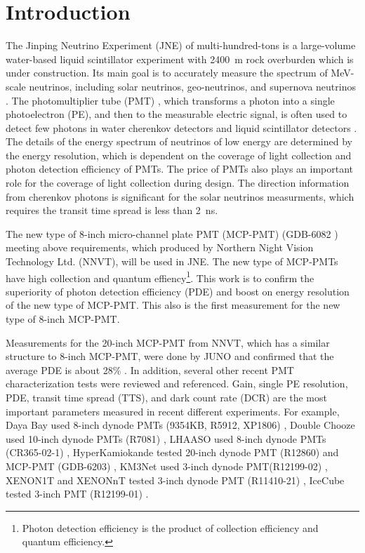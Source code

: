 \section{Introduction}
The Jinping Neutrino Experiment (JNE) of multi-hundred-tons is a large-volume water-based liquid scintillator experiment with \SI{2400}{m} rock overburden \cite{LetterJNE2017} which is under construction. Its main goal is to accurately measure the spectrum of MeV-scale neutrinos, including solar neutrinos, geo-neutrinos, and supernova neutrinos \cite{LetterJNE2017}.
The photomultiplier tube (PMT) \cite{HAMAMATSUManual}, which transforms a photon into a single photoelectron (PE), and then to the measurable electric signal, is often used to detect few photons in water cherenkov detectors \cite{SNO,SuperK} and liquid scintillator detectors \cite{KamLAND,JUNO:2015zny}. The details of the energy spectrum of neutrinos of low energy are determined by the energy resolution, which is dependent on the coverage of light collection and photon detection efficiency of PMTs. The price of PMTs also plays an important role for the coverage of light collection during design. The direction information from cherenkov photons is significant for the solar neutrinos measurments, which requires the transit time spread is less than \SI{2}{ns}\cite{}.

The new type of 8-inch micro-channel plate PMT (MCP-PMT) (GDB-6082 \cite{GDB-6082}) meeting above requirements, which produced by Northern Night Vision Technology Ltd. (NNVT), will be used in JNE. The new type of MCP-PMTs have high collection and quantum effiency\footnote{Photon detection efficiency is the product of collection efficiency and quantum efficiency.}. This work is to confirm the superiority of photon detection efficiency (PDE) and boost on energy resolution of the new type of MCP-PMT. This also is the first measurement for the new type of 8-inch MCP-PMT.

Measurements for the 20-inch MCP-PMT from NNVT, which has a similar structure to 8-inch MCP-PMT, were done by JUNO and confirmed that the average PDE is about 28\% \cite{JUNOMassTesting}. In addition, several other recent PMT characterization tests were reviewed and referenced. Gain, single PE resolution, PDE, transit time spread (TTS), and dark count rate (DCR) are the most important parameters measured in recent different experiments. For example, Daya Bay used 8-inch dynode PMTs (9354KB, R5912, XP1806) \cite{DayaBayTesting}, Double Chooze used 10-inch dynode PMTs (R7081) \cite{DoubleChoozeTesting}, LHAASO used 8-inch dynode PMTs (CR365-02-1) \cite{LHAASOTesting}, HyperKamiokande tested 20-inch dynode PMT (R12860) and MCP-PMT (GDB-6203) \cite{HyperKTesting}, KM3Net used 3-inch dynode PMT(R12199-02) \cite{KM3NetTesting}, XENON1T and XENONnT tested 3-inch dynode PMT (R11410-21) \cite{XENON1TTesting}\cite{XENONnTTesting}, IceCube tested 3-inch PMT (R12199-01) \cite{IceCubeTesting}.

